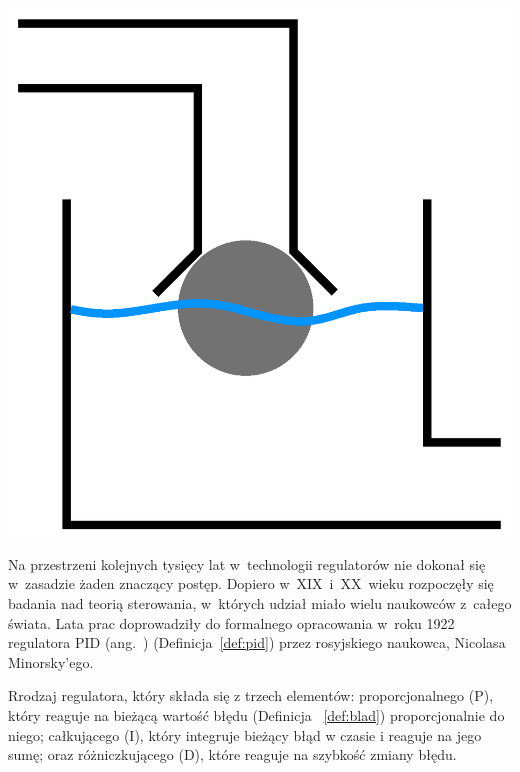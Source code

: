 \begin{center}
  \includegraphics[scale=0.15]{images/ktesibius.png}
  \label{fig:ktesibius}
\end{center}

Na przestrzeni kolejnych tysięcy lat w~technologii regulatorów nie dokonał się w~zasadzie żaden znaczący postęp. Dopiero w~XIX~i~XX~wieku rozpoczęły się badania nad teorią sterowania, w~których udział miało wielu naukowców z~całego świata. Lata prac doprowadziły do formalnego opracowania w~roku 1922 regulatora PID (ang.~) (Definicja~\ref{def:pid}) przez rosyjskiego naukowca, Nicolasa Minorsky'ego\cite{bib:pidminorsky}.

\begin{Definition}\label{def:pid}
  Rrodzaj regulatora, który składa się z trzech elementów: proporcjonalnego (P), który reaguje na bieżącą wartość błędu (Definicja~ \ref{def:blad}) proporcjonalnie do niego; całkującego (I), który integruje bieżący błąd w czasie i reaguje na jego sumę; oraz różniczkującego (D), które reaguje na szybkość zmiany błędu. 
\end{Definition}

